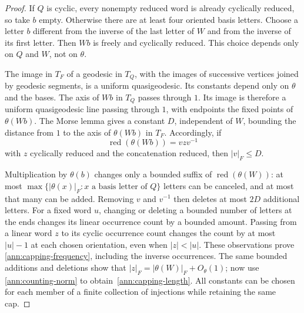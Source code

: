 \begin{proof}
If $Q$ is cyclic, every nonempty reduced word is already cyclically
reduced, so take $b$ empty.  Otherwise there are at least four oriented
basis letters.  Choose a letter $b$ different from the inverse of the
last letter of $W$ and from the inverse of its first letter.  Then
$Wb$ is freely and cyclically reduced.  This choice depends only on
$Q$ and $W$, not on $\theta$.

The image in $T_F$ of a geodesic in $T_Q$, with the images of
successive vertices joined by geodesic segments, is a uniform
quasigeodesic.  Its constants depend only on $\theta$ and the bases.
The axis of $Wb$ in $T_Q$ passes through $1$.  Its image is therefore
a uniform quasigeodesic line passing through $1$, with endpoints the
fixed points of $\theta(Wb)$.  The Morse lemma gives a constant
$D$, independent of $W$, bounding the distance from $1$ to the
axis of $\theta(Wb)$ in $T_F$.  Accordingly, if
\[
 \operatorname{red}(\theta(Wb))=v z v^{-1}
\]
with $z$ cyclically reduced and the concatenation reduced, then
$|v|_F\leq D$.

Multiplication by $\theta(b)$ changes only a bounded suffix of
$\operatorname{red}(\theta(W))$: at most
$\max\{|\theta(x)|_F:x\text{ a basis letter of }Q\}$ letters can
be canceled, and at most that many can be added.  Removing $v$ and
$v^{-1}$ then deletes at most $2D$ additional letters.  For a fixed
word $u$, changing or deleting a bounded number of letters at the
ends changes its linear occurrence count by a bounded amount.
Passing from a linear word $z$ to its cyclic occurrence count changes
the count by at most $|u|-1$ at each chosen orientation, even when
$|z|<|u|$.  These observations prove
\eqref{ann:capping-frequency}, including the inverse occurrences.
The same bounded additions and deletions show that
$|z|_F=|\theta(W)|_F+O_\theta(1)$; now use
\eqref{ann:counting-norm} to obtain~\eqref{ann:capping-length}.
All constants can be chosen for each member of a finite collection
of injections while retaining the same cap.
\end{proof}

